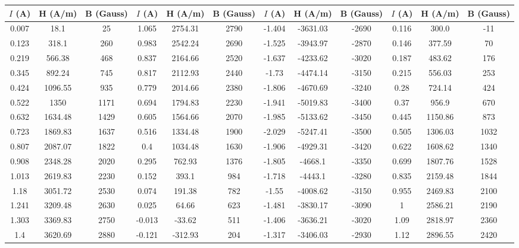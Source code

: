 \begin{table*}
\begin{ruledtabular}
\begin{tabular}{|ccc|ccc|ccc|ccc|} 
     $I$ (A) & H (A/m) & B (Gauss) &  $I$ (A) & H (A/m) & B (Gauss) &  $I$ (A) & H (A/m) & B (Gauss) &  $I$ (A) & H (A/m) & B (Gauss) \\ \hline
     0.007 &   18.1  &   25 &  1.065 &  2754.31 &  2790 & -1.404 & -3631.03 & -2690 & 0.116 & 300.0  & -11 \\
     0.123 &  318.1  &  260 &  0.983 &  2542.24 &  2690 & -1.525 & -3943.97 & -2870 & 0.146 & 377.59  & 70  \\
     0.219 &  566.38 &  468 &  0.837 &  2164.66 &  2520 & -1.637 & -4233.62 & -3020 & 0.187 & 483.62  & 176 \\
     0.345 &  892.24 &  745 &  0.817 &  2112.93 &  2440 & -1.73  & -4474.14 & -3150 & 0.215 & 556.03  & 253 \\
     0.424 & 1096.55 &  935 &  0.779 &  2014.66 &  2380 & -1.806 & -4670.69 & -3240 & 0.28  & 724.14  & 424 \\
     0.522 & 1350    & 1171 &  0.694 &  1794.83 &  2230 & -1.941 & -5019.83 & -3400 & 0.37  & 956.9   & 670 \\
     0.632 & 1634.48 & 1429 &  0.605 &  1564.66 &  2070 & -1.985 & -5133.62 & -3450 & 0.445 & 1150.86 & 873 \\
     0.723 & 1869.83 & 1637 &  0.516 &  1334.48 &  1900 & -2.029 & -5247.41 & -3500 & 0.505 & 1306.03 & 1032\\
     0.807 & 2087.07 & 1822 &  0.4   &  1034.48 &  1630 & -1.906 & -4929.31 & -3420 & 0.622 & 1608.62 & 1340\\
     0.908 & 2348.28 & 2020 &  0.295 &   762.93 &  1376 & -1.805 & -4668.1  & -3350 & 0.699 & 1807.76 & 1528\\
     1.013 & 2619.83 & 2230 &  0.152 &   393.1  &   984 & -1.718 & -4443.1  & -3280 & 0.835 & 2159.48 & 1844\\
     1.18  & 3051.72 & 2530 &  0.074 &   191.38 &   782 & -1.55  & -4008.62 & -3150 & 0.955 & 2469.83 & 2100\\
     1.241 & 3209.48 & 2630 &  0.025 &    64.66 &   623 & -1.481 & -3830.17 & -3090 & 1  & 2586.21 & 2190\\
     1.303 & 3369.83 & 2750 & -0.013 &   -33.62 &   511 & -1.406 & -3636.21 & -3020 & 1.09  & 2818.97 & 2360\\
     1.4   & 3620.69 & 2880 & -0.121 &  -312.93 &   204 & -1.317 & -3406.03 & -2930 & 1.12  & 2896.55 & 2420\\

\end{tabular}
\end{ruledtabular}
\end{table*}
